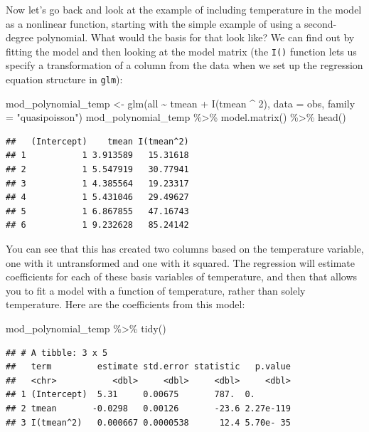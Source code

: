 \documentclass[
]{book}
\newenvironment{Shaded}{\begin{snugshade}}{\end{snugshade}}
\newcommand{\AttributeTok}[1]{\textcolor[rgb]{0.77,0.63,0.00}{#1}}
\newcommand{\DecValTok}[1]{\textcolor[rgb]{0.00,0.00,0.81}{#1}}
\newcommand{\FunctionTok}[1]{\textcolor[rgb]{0.00,0.00,0.00}{#1}}
\newcommand{\NormalTok}[1]{#1}
\newcommand{\OtherTok}[1]{\textcolor[rgb]{0.56,0.35,0.01}{#1}}
\newcommand{\SpecialCharTok}[1]{\textcolor[rgb]{0.00,0.00,0.00}{#1}}
\newcommand{\StringTok}[1]{\textcolor[rgb]{0.31,0.60,0.02}{#1}}
\begin{document}
Now let's go back and look at the example of including temperature in the model as a nonlinear
function, starting with the simple example of using a second-degree polynomial. What would
the basis for that look like? We can find out by fitting the model and then looking at the
model matrix (the \texttt{I()} function lets us specify a transformation of a column from the
data when we set up the regression equation structure in \texttt{glm}):

\begin{Shaded}
\begin{Highlighting}[]
\NormalTok{mod\_polynomial\_temp }\OtherTok{\textless{}{-}} \FunctionTok{glm}\NormalTok{(all }\SpecialCharTok{\textasciitilde{}}\NormalTok{ tmean }\SpecialCharTok{+} \FunctionTok{I}\NormalTok{(tmean }\SpecialCharTok{\^{}} \DecValTok{2}\NormalTok{), }
                           \AttributeTok{data =}\NormalTok{ obs, }\AttributeTok{family =} \StringTok{"quasipoisson"}\NormalTok{)}
\NormalTok{mod\_polynomial\_temp }\SpecialCharTok{\%\textgreater{}\%} 
  \FunctionTok{model.matrix}\NormalTok{() }\SpecialCharTok{\%\textgreater{}\%} 
  \FunctionTok{head}\NormalTok{()}
\end{Highlighting}
\end{Shaded}

\begin{verbatim}
##   (Intercept)    tmean I(tmean^2)
## 1           1 3.913589   15.31618
## 2           1 5.547919   30.77941
## 3           1 4.385564   19.23317
## 4           1 5.431046   29.49627
## 5           1 6.867855   47.16743
## 6           1 9.232628   85.24142
\end{verbatim}

You can see that this has created two columns based on the temperature variable, one with
it untransformed and one with it squared. The regression will estimate coefficients for each
of these basis variables of temperature, and then that allows you to fit a model with a
function of temperature, rather than solely temperature. Here are the coefficients from
this model:

\begin{Shaded}
\begin{Highlighting}[]
\NormalTok{mod\_polynomial\_temp }\SpecialCharTok{\%\textgreater{}\%} 
  \FunctionTok{tidy}\NormalTok{()}
\end{Highlighting}
\end{Shaded}

\begin{verbatim}
## # A tibble: 3 x 5
##   term         estimate std.error statistic   p.value
##   <chr>           <dbl>     <dbl>     <dbl>     <dbl>
## 1 (Intercept)  5.31     0.00675       787.  0.       
## 2 tmean       -0.0298   0.00126       -23.6 2.27e-119
## 3 I(tmean^2)   0.000667 0.0000538      12.4 5.70e- 35
\end{verbatim}
\end{document}
